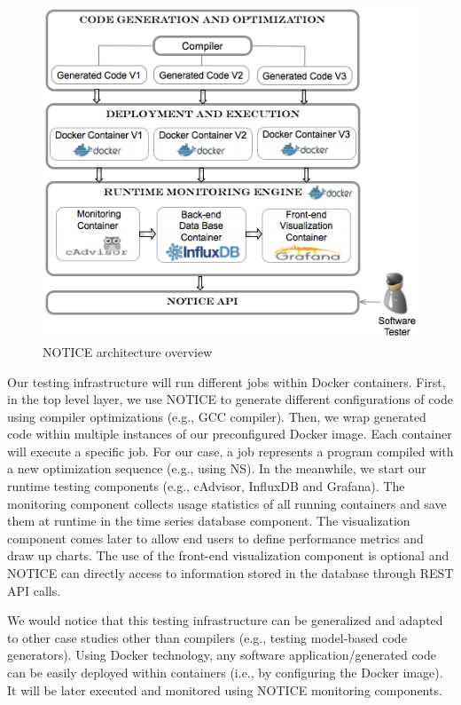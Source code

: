 \begin{figure}[h]
\centering
	\includegraphics[width=1.\linewidth]{Ressources/genecoApproach.png}
	\caption{NOTICE architecture overview}
	\vspace{-1.5em}
\end{figure}
Our testing infrastructure will run different jobs within Docker containers. First, in the top level layer, we use NOTICE to generate different configurations of code using compiler optimizations (e.g., GCC compiler). Then, we wrap generated code within multiple instances of our preconfigured Docker image. Each container will execute a specific job. For our case, a job represents a program compiled with a new optimization sequence (e.g., using NS). In the meanwhile, we start our runtime testing components (e.g., cAdvisor, InfluxDB and Grafana). The monitoring component collects usage statistics of all running containers and save them at runtime in the time series database component. The visualization component comes later to allow end users to define performance metrics and draw up charts. The use of the front-end visualization component is optional and NOTICE can directly access to information stored in the database through REST API calls.  
\begin{remark}
We would notice that this testing infrastructure can be generalized and adapted to other case studies other than compilers (e.g., testing model-based code generators). Using Docker technology, any software application/generated code can be easily deployed within containers (i.e., by configuring the Docker image). It will be later executed and monitored using NOTICE monitoring components. 
\end{remark}

